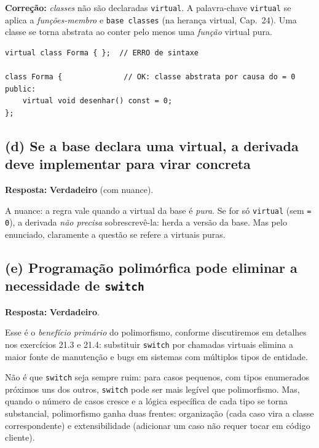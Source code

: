 \documentclass[11pt,a4paper]{article}
\begin{document}
\textbf{Corre\c{c}\~ao:} \emph{classes} n\~ao s\~ao declaradas \texttt{virtual}. A palavra-chave \texttt{virtual} se aplica a \emph{fun\c{c}\~oes-membro} e \texttt{base classes} (na heran\c{c}a virtual, Cap.~24). Uma classe se torna abstrata ao conter pelo menos uma \emph{fun\c{c}\~ao} virtual pura.

\begin{lstlisting}[style=cppcode,numbers=none]
virtual class Forma { };  // ERRO de sintaxe

class Forma {              // OK: classe abstrata por causa do = 0
public:
    virtual void desenhar() const = 0;
};
\end{lstlisting}

\subsection*{(d) Se a base declara uma virtual, a derivada deve implementar para virar concreta}

\begin{resposta}\textbf{Resposta:} \textbf{Verdadeiro} (com nuance).\end{resposta}

A nuance: a regra vale quando a virtual da base \'e \emph{pura}. Se for s\'o \texttt{virtual} (sem \texttt{= 0}), a derivada \emph{n\~ao precisa} sobrescrev\^e-la: herda a vers\~ao da base. Mas pelo enunciado, claramente a quest\~ao se refere a virtuais puras.

\subsection*{(e) Programa\c{c}\~ao polim\'orfica pode eliminar a necessidade de \texttt{switch}}

\begin{resposta}\textbf{Resposta:} \textbf{Verdadeiro}.\end{resposta}

Esse \'e o \emph{benef\'icio prim\'ario} do polimorfismo, conforme discutiremos em detalhes nos exerc\'icios 21.3 e 21.4: substituir \texttt{switch} por chamadas virtuais elimina a maior fonte de manuten\c{c}\~ao e bugs em sistemas com m\'ultiplos tipos de entidade.

\begin{obseng}
N\~ao \'e que \texttt{switch} seja sempre ruim: para casos pequenos, com tipos enumerados pr\'oximos uns dos outros, \texttt{switch} pode ser mais leg\'ivel que polimorfismo. Mas, quando o n\'umero de casos cresce e a l\'ogica espec\'ifica de cada tipo se torna substancial, polimorfismo ganha duas frentes: organiza\c{c}\~ao (cada caso vira a classe correspondente) e extensibilidade (adicionar um caso n\~ao requer tocar em c\'odigo cliente).
\end{obseng}
\end{document}
